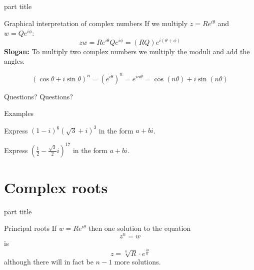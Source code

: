 \documentclass{beamer}
\begin{document}
\begin{frame}
\begin{beamercolorbox}[sep=12pt,center]{part title}
\insertsection\par
\end{beamercolorbox}
\end{frame}

\begin{frame}{Graphical interpretation of complex numbers}
If we multiply $z=Re^{i\theta}$ and $w=Qe^{i\phi}$:
\begin{equation*}
zw=Re^{i\theta}Qe^{i\phi} = (RQ)e^{i(\theta+\phi)}
\end{equation*}\vfill
{\bf Slogan:} To multiply two complex numbers we multiply the moduli and add the angles.\vfill
\begin{theorem}
\begin{equation*}
(\cos\theta+i\sin\theta)^n = (e^{i\theta})^n = e^{in\theta} = \cos(n\theta)+i\sin(n\theta)
\end{equation*}
\end{theorem}
\end{frame}

\begin{frame}{Questions?}
Questions?
\end{frame}


\begin{frame}{Examples}
\begin{example}
Express $(1-i)^6(\sqrt{3}+i)^3$ in the form $a+bi$. %
\end{example}
\begin{example}
Express $(\frac{1}{2}-\frac{\sqrt{3}}{2}i)^{17}$ in the form $a+bi$. %
\end{example}
\end{frame}

\section{Complex roots}

\begin{frame}
\begin{beamercolorbox}[sep=12pt,center]{part title}
\insertsection\par
\end{beamercolorbox}
\end{frame}

\begin{frame}{Principal roots}
If $w = Re^{i\theta}$ then one solution to the equation
\begin{equation*}
z^n = w
\end{equation*}
is 
\begin{equation*}
z = \sqrt[n]{R}\cdot e^{\frac{i\theta}{n}}
\end{equation*}
although there will in fact be $n-1$ more solutions.
\end{frame}
\end{document}
